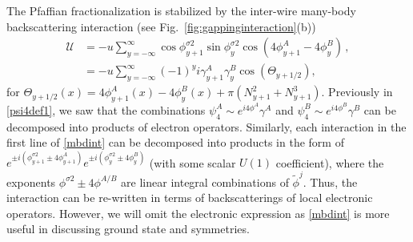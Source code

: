 The Pfaffian fractionalization is stabilized by the inter-wire many-body backscattering interaction (see Fig.~\ref{fig:gappinginteraction}(b)) \begin{align}\mathcal{U}&=-u\sum_{y=-\infty}^\infty\cos\phi^{\sigma2}_{y+1}\sin\phi^{\sigma2}_y\cos\left(4\phi^A_{y+1}-4\phi^B_y\right)\nonumber \,,\\
&=-u\sum_{y=-\infty}^\infty(-1)^yi\gamma^A_{y+1}\gamma^B_y\cos\left(\Theta_{y+1/2}\right),\label{mbdint}\end{align} for $\Theta_{y+1/2}(x)=4\phi^A_{y+1}(x)-4\phi^B_y(x)+\pi(N_{y+1}^2+N_{y+1}^3)$. Previously in \eqref{psi4def1}, we saw that the combinations $\psi_4^A\sim e^{i4\phi^A}\gamma^A$ and $\psi_4^B\sim e^{i4\phi^B}\gamma^B$ can be decomposed into products of electron operators. Similarly, each interaction in the first line of \eqref{mbdint} can be decomposed into products in the form of $e^{\pm i(\phi^{\sigma2}_{y+1}\pm4\phi^A_{y+1})}e^{\pm i(\phi^{\sigma2}_y\pm4\phi^B_y)}$ (with some scalar $U(1)$ coefficient), where the exponents $\phi^{\sigma2}\pm4\phi^{A/B}$ are linear integral combinations of $\tilde\phi^j$. Thus, the interaction can be re-written in terms of backscatterings of local electronic operators. However, we will omit the electronic expression as \eqref{mbdint} is more useful in discussing ground state and symmetries. 

